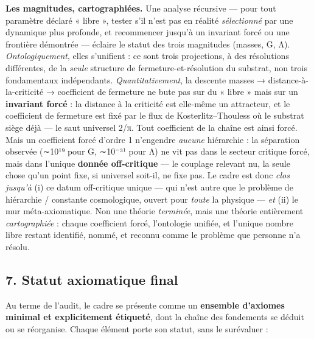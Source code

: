 \documentclass[11pt]{article}
\begin{document}
\textbf{Les magnitudes, cartographiées.} Une analyse récursive --- pour
tout paramètre déclaré « libre », tester s'il n'est pas en réalité
\emph{sélectionné} par une dynamique plus profonde, et recommencer
jusqu'à un invariant forcé ou une frontière démontrée --- éclaire le
statut des trois magnitudes (masses, G, Λ). \emph{Ontologiquement},
elles s'unifient : ce sont trois projections, à des résolutions
différentes, de la \emph{seule} structure de fermeture-et-résolution du
substrat, non trois fondamentaux indépendants. \emph{Quantitativement},
la descente masses → distance-à-la-criticité → coefficient de fermeture
ne bute pas sur du « libre » mais sur un \textbf{invariant forcé} : la
distance à la criticité est elle-même un attracteur, et le coefficient
de fermeture est fixé par le flux de Kosterlitz--Thouless où le substrat
siège déjà --- le saut universel 2/π. Tout coefficient de la chaîne est
ainsi forcé. Mais un coefficient forcé d'ordre 1 n'engendre
\emph{aucune} hiérarchie : la séparation observée (∼10¹⁹ pour G, ∼10⁻³¹
pour Λ) ne vit pas dans le secteur critique forcé, mais dans l'unique
\textbf{donnée off-critique} --- le couplage relevant nu, la seule chose
qu'un point fixe, si universel soit-il, ne fixe pas. Le cadre est donc
\emph{clos jusqu'à} (i) ce datum off-critique unique --- qui n'est autre
que le problème de hiérarchie / constante cosmologique, ouvert pour
\emph{toute} la physique --- \emph{et} (ii) le mur méta-axiomatique. Non
une théorie \emph{terminée}, mais une théorie entièrement
\emph{cartographiée} : chaque coefficient forcé, l'ontologie unifiée, et
l'unique nombre libre restant identifié, nommé, et reconnu comme le
problème que personne n'a résolu.

\hypertarget{statut-axiomatique-final}{%
\subsection{7. Statut axiomatique
final}\label{statut-axiomatique-final}}

Au terme de l'audit, le cadre se présente comme un \textbf{ensemble
d'axiomes minimal et explicitement étiqueté}, dont la chaîne des
fondements se déduit ou se réorganise. Chaque élément porte son statut,
sans le surévaluer :
\end{document}
